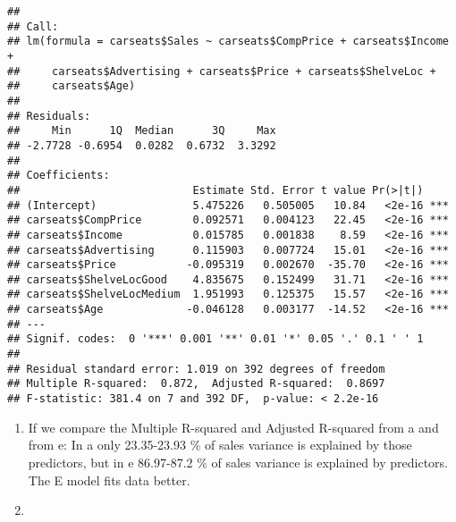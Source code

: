 \documentclass[
]{article}
\newenvironment{Shaded}{\begin{snugshade}}{\end{snugshade}}
\newcommand{\AttributeTok}[1]{\textcolor[rgb]{0.13,0.29,0.53}{#1}}
\newcommand{\FloatTok}[1]{\textcolor[rgb]{0.00,0.00,0.81}{#1}}
\newcommand{\FunctionTok}[1]{\textcolor[rgb]{0.13,0.29,0.53}{\textbf{#1}}}
\newcommand{\NormalTok}[1]{#1}
\newcommand{\SpecialCharTok}[1]{\textcolor[rgb]{0.81,0.36,0.00}{\textbf{#1}}}
\begin{document}
\begin{verbatim}
## 
## Call:
## lm(formula = carseats$Sales ~ carseats$CompPrice + carseats$Income + 
##     carseats$Advertising + carseats$Price + carseats$ShelveLoc + 
##     carseats$Age)
## 
## Residuals:
##     Min      1Q  Median      3Q     Max 
## -2.7728 -0.6954  0.0282  0.6732  3.3292 
## 
## Coefficients:
##                           Estimate Std. Error t value Pr(>|t|)    
## (Intercept)               5.475226   0.505005   10.84   <2e-16 ***
## carseats$CompPrice        0.092571   0.004123   22.45   <2e-16 ***
## carseats$Income           0.015785   0.001838    8.59   <2e-16 ***
## carseats$Advertising      0.115903   0.007724   15.01   <2e-16 ***
## carseats$Price           -0.095319   0.002670  -35.70   <2e-16 ***
## carseats$ShelveLocGood    4.835675   0.152499   31.71   <2e-16 ***
## carseats$ShelveLocMedium  1.951993   0.125375   15.57   <2e-16 ***
## carseats$Age             -0.046128   0.003177  -14.52   <2e-16 ***
## ---
## Signif. codes:  0 '***' 0.001 '**' 0.01 '*' 0.05 '.' 0.1 ' ' 1
## 
## Residual standard error: 1.019 on 392 degrees of freedom
## Multiple R-squared:  0.872,  Adjusted R-squared:  0.8697 
## F-statistic: 381.4 on 7 and 392 DF,  p-value: < 2.2e-16
\end{verbatim}

\begin{enumerate}
\def\labelenumi{\alph{enumi})}
\setcounter{enumi}{5}
\item
  If we compare the Multiple R-squared and Adjusted R-squared from a and
  from e: In a only 23.35-23.93 \% of sales variance is explained by
  those predictors, but in e 86.97-87.2 \% of sales variance is
  explained by predictors. The E model fits data better.
\item
\end{enumerate}

\begin{Shaded}
\end{Shaded}
\end{document}
